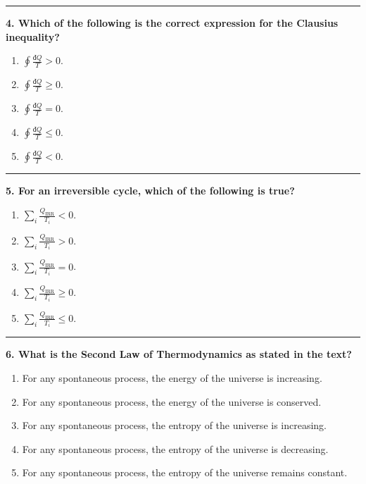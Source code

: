 \documentclass[
  9pt,
]{extbook}
\providecommand{\tightlist}{%
  \setlength{\itemsep}{0pt}\setlength{\parskip}{0pt}}
\theoremstyle{definition}
\theoremstyle{definition}
\theoremstyle{definition}
\theoremstyle{definition}
\theoremstyle{remark}
\begin{document}
\begin{center}\rule{0.5\linewidth}{0.5pt}\end{center}

\textbf{4. Which of the following is the correct expression for the Clausius inequality?}

\begin{enumerate}
\def\labelenumi{\alph{enumi}.}
\tightlist
\item
  \(\oint \frac{đQ}{T} > 0\).
\item
  \(\oint \frac{đQ}{T} \geq 0\).
\item
  \(\oint \frac{đQ}{T} = 0\).
\item
  \(\oint \frac{đQ}{T} \leq 0\).
\item
  \(\oint \frac{đQ}{T} < 0\).
\end{enumerate}

\begin{center}\rule{0.5\linewidth}{0.5pt}\end{center}

\textbf{5. For an irreversible cycle, which of the following is true?}

\begin{enumerate}
\def\labelenumi{\alph{enumi}.}
\tightlist
\item
  \(\sum_i \frac{Q_{\text{IRR}}}{T_i} < 0\).
\item
  \(\sum_i \frac{Q_{\text{IRR}}}{T_i} > 0\).
\item
  \(\sum_i \frac{Q_{\text{IRR}}}{T_i} = 0\).
\item
  \(\sum_i \frac{Q_{\text{IRR}}}{T_i} \geq 0\).
\item
  \(\sum_i \frac{Q_{\text{IRR}}}{T_i} \leq 0\).
\end{enumerate}

\begin{center}\rule{0.5\linewidth}{0.5pt}\end{center}

\textbf{6. What is the Second Law of Thermodynamics as stated in the text?}

\begin{enumerate}
\def\labelenumi{\alph{enumi}.}
\tightlist
\item
  For any spontaneous process, the energy of the universe is increasing.
\item
  For any spontaneous process, the energy of the universe is conserved.
\item
  For any spontaneous process, the entropy of the universe is increasing.
\item
  For any spontaneous process, the entropy of the universe is decreasing.
\item
  For any spontaneous process, the entropy of the universe remains constant.
\end{enumerate}
\end{document}
